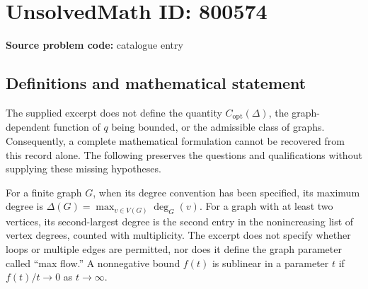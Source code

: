 \documentclass[11pt]{article}
\begin{document}
\section*{UnsolvedMath ID: 800574}
\textbf{Source problem code:} catalogue entry
\subsection{Definitions and mathematical statement}
The supplied excerpt does not define the quantity \(C_{\mathrm{opt}}(\Delta)\), the graph-dependent function of \(q\) being bounded, or the admissible class of graphs. Consequently, a complete mathematical formulation cannot be recovered from this record alone. The following preserves the questions and qualifications without supplying these missing hypotheses.

For a finite graph \(G\), when its degree convention has been specified, its maximum degree is \(\Delta(G)=\max_{v\in V(G)}\deg_G(v)\). For a graph with at least two vertices, its second-largest degree is the second entry in the nonincreasing list of vertex degrees, counted with multiplicity. The excerpt does not specify whether loops or multiple edges are permitted, nor does it define the graph parameter called ``max flow.'' A nonnegative bound \(f(t)\) is sublinear in a parameter \(t\) if \(f(t)/t\to0\) as \(t\to\infty\).
\end{document}
